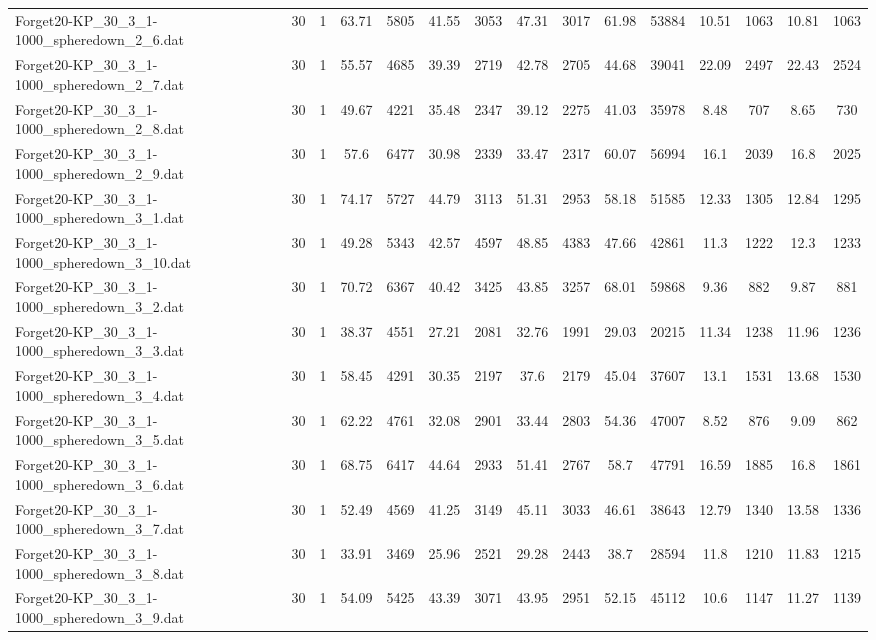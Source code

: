 \begin{table}[!ht]
{\begin{tabular}{lcccccccccccccc}
Forget20-KP\_30\_3\_1-1000\_spheredown\_2\_6.dat & 30 & 1 & 63.71 & 5805 & 41.55 & 3053 & 47.31 & 3017 & 61.98 & 53884 & 10.51 & 1063 & 10.81 & 1063 \\
Forget20-KP\_30\_3\_1-1000\_spheredown\_2\_7.dat & 30 & 1 & 55.57 & 4685 & 39.39 & 2719 & 42.78 & 2705 & 44.68 & 39041 & 22.09 & 2497 & 22.43 & 2524 \\
Forget20-KP\_30\_3\_1-1000\_spheredown\_2\_8.dat & 30 & 1 & 49.67 & 4221 & 35.48 & 2347 & 39.12 & 2275 & 41.03 & 35978 & 8.48 & 707 & 8.65 & 730 \\
Forget20-KP\_30\_3\_1-1000\_spheredown\_2\_9.dat & 30 & 1 & 57.6 & 6477 & 30.98 & 2339 & 33.47 & 2317 & 60.07 & 56994 & 16.1 & 2039 & 16.8 & 2025 \\
Forget20-KP\_30\_3\_1-1000\_spheredown\_3\_1.dat & 30 & 1 & 74.17 & 5727 & 44.79 & 3113 & 51.31 & 2953 & 58.18 & 51585 & 12.33 & 1305 & 12.84 & 1295 \\
Forget20-KP\_30\_3\_1-1000\_spheredown\_3\_10.dat & 30 & 1 & 49.28 & 5343 & 42.57 & 4597 & 48.85 & 4383 & 47.66 & 42861 & 11.3 & 1222 & 12.3 & 1233 \\
Forget20-KP\_30\_3\_1-1000\_spheredown\_3\_2.dat & 30 & 1 & 70.72 & 6367 & 40.42 & 3425 & 43.85 & 3257 & 68.01 & 59868 & 9.36 & 882 & 9.87 & 881 \\
Forget20-KP\_30\_3\_1-1000\_spheredown\_3\_3.dat & 30 & 1 & 38.37 & 4551 & 27.21 & 2081 & 32.76 & 1991 & 29.03 & 20215 & 11.34 & 1238 & 11.96 & 1236 \\
Forget20-KP\_30\_3\_1-1000\_spheredown\_3\_4.dat & 30 & 1 & 58.45 & 4291 & 30.35 & 2197 & 37.6 & 2179 & 45.04 & 37607 & 13.1 & 1531 & 13.68 & 1530 \\
Forget20-KP\_30\_3\_1-1000\_spheredown\_3\_5.dat & 30 & 1 & 62.22 & 4761 & 32.08 & 2901 & 33.44 & 2803 & 54.36 & 47007 & 8.52 & 876 & 9.09 & 862 \\
Forget20-KP\_30\_3\_1-1000\_spheredown\_3\_6.dat & 30 & 1 & 68.75 & 6417 & 44.64 & 2933 & 51.41 & 2767 & 58.7 & 47791 & 16.59 & 1885 & 16.8 & 1861 \\
Forget20-KP\_30\_3\_1-1000\_spheredown\_3\_7.dat & 30 & 1 & 52.49 & 4569 & 41.25 & 3149 & 45.11 & 3033 & 46.61 & 38643 & 12.79 & 1340 & 13.58 & 1336 \\
Forget20-KP\_30\_3\_1-1000\_spheredown\_3\_8.dat & 30 & 1 & 33.91 & 3469 & 25.96 & 2521 & 29.28 & 2443 & 38.7 & 28594 & 11.8 & 1210 & 11.83 & 1215 \\
Forget20-KP\_30\_3\_1-1000\_spheredown\_3\_9.dat & 30 & 1 & 54.09 & 5425 & 43.39 & 3071 & 43.95 & 2951 & 52.15 & 45112 & 10.6 & 1147 & 11.27 & 1139 \\

\end{tabular}}
\end{table}
